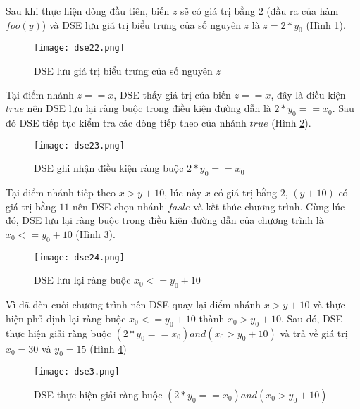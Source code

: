 Sau khi thực hiện dòng đầu tiên, biến $ z $ sẽ có giá trị bằng $2$ (đầu ra của hàm $ foo(y) $) và DSE lưu giá trị biểu trưng của số nguyên $ z $ là $z = 2*y_{0}$ (Hình \ref{fig:dse22}).

\begin{figure}[H]	
	\begin{center}
		\texttt{[image: dse22.png]}
	\end{center}
	\caption{DSE lưu giá trị biểu trưng của số nguyên $ z $}
	\label{fig:dse22}		
\end{figure}

Tại điểm nhánh $ z == x $, DSE thấy giá trị của biến $ z == x $, đây là điều kiện $ true $ nên DSE lưu lại ràng buộc trong điều kiện đường dẫn là $2*y_{0} == x_{0}$. Sau đó DSE tiếp tục kiểm tra các dòng tiếp theo của nhánh $ true $ (Hình \ref{fig:dse23}).

\begin{figure}[H]	
	\begin{center}
		\texttt{[image: dse23.png]}
	\end{center}
	\caption{DSE ghi nhận điều kiện ràng buộc $2*y_{0} == x_{0}$}
	\label{fig:dse23}	
\end{figure}

Tại điểm nhánh tiếp theo $ x > y+10 $, lúc này $ x $ có giá trị bằng $2$, $(y + 10)$ có giá trị bằng $11$ nên DSE chọn nhánh $ fasle $ và kết thúc chương trình. Cùng lúc đó, DSE lưu lại ràng buộc trong điều kiện đường dẫn của chương trình là $x_{0} <= y_{0} + 10$ (Hình \ref{fig:dse24}).

\begin{figure}[H]	
	\begin{center}
		\texttt{[image: dse24.png]}
	\end{center}
	\caption{DSE lưu lại ràng buộc $x_{0} <= y_{0} + 10$}
	\label{fig:dse24}		
\end{figure}

Vì đã đến cuối chương trình nên DSE quay lại điểm nhánh $ x > y+10 $ và thực hiện phủ định lại ràng buộc $x_{0} <= y_{0} + 10$ thành $ x_{0} > y_{0} + 10 $. Sau đó, DSE thực hiện giải ràng buộc $(2*y_{0} == x_{0}) and (x_{0} > y_{0} + 10)$ và trả về giá trị $x_{0} = 30$ và $y_{0} = 15$ (Hình \ref{fig:dse3})

\begin{figure}[H]	
	\begin{center}
		\texttt{[image: dse3.png]}
	\end{center}
	\caption{DSE thực hiện giải ràng buộc $(2*y_{0} == x_{0}) and (x_{0} > y_{0} + 10)$}
	\label{fig:dse3}
\end{figure}

